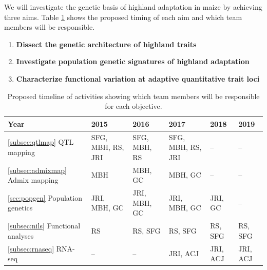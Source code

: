 We will investigate the genetic basis of highland adaptation in maize by achieving three aims. Table \ref{tab:timeline} shows the proposed timing of each aim and which team members will be responsible.

\begin{enumerate}
\item {\bf Dissect the genetic architecture of highland traits}
\item {\bf Investigate population genetic signatures of highland adaptation}
\item {\bf Characterize functional variation at adaptive quantitative trait loci}
\end{enumerate}

\begin{table}[]
\label{tab:timeline}
\begin{center}
\begin{tabular}{p{3.5cm}p{2cm}p{2cm}p{2cm}p{2cm}p{2cm}}\\\toprule  
{\bf Year} & {\bf 2015} & {\bf 2016} & {\bf 2017} & {\bf 2018} & {\bf 2019} \\\midrule
\ref{subsec:qtlmap} \hspace{3cm} QTL mapping 			& SFG, MBH, RS, JRI 	& SFG, MBH, RS 	& SFG, MBH, RS, JRI 	& -- 			& -- \\\midrule
\ref{subsec:admixmap} \hspace{3cm} Admix mapping		& MBH 				& MBH, GC 		& MBH, GC 			& -- 			& -- \\\midrule
\ref{sec:popgen} \hspace{3cm} Population genetics		& JRI, MBH, GC 		& JRI, MBH, GC  	& JRI, MBH, GC		& JRI, GC 	& -- \\\midrule
\ref{subsec:nils} \hspace{2cm} Functional \mbox{analyses} 		& RS 				& RS, SFG		& RS, SFG 			& RS, SFG 	& RS, SFG  \\\midrule
\ref{subsec:rnaseq} \hspace{2cm} RNA-seq 				& --  					& --  				& JRI, ACJ  			& JRI, ACJ	& JRI, ACJ \\\bottomrule
\end{tabular}
\caption{Proposed timeline of activities showing which team members will be responsible for each objective.}\label{tab:timeline}

\end{center}
\end{table} 

